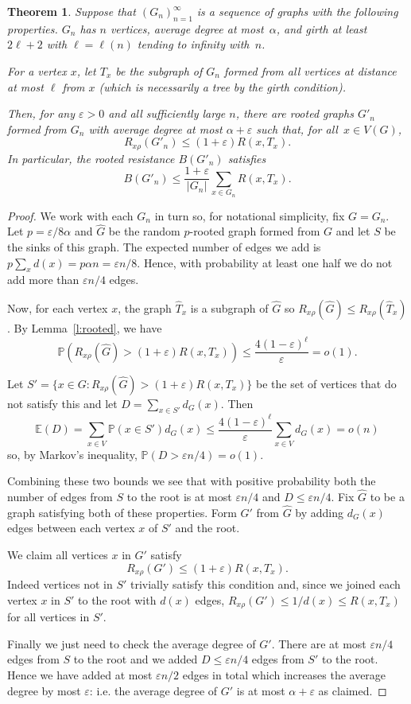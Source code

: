 \documentclass[11pt]{article}
\newtheorem{theorem}{Theorem}
\theoremstyle{remark}
\def\a{\alpha}
\def\eps{\varepsilon}
\def\E{\mathbb{E}}
\newcommand\Prb{\mathbb{P}}
\begin{document}
\begin{theorem}\label{t:main-rooted-rrg-lemma}
  Suppose that $(G_n)_{n=1}^\infty$ is a sequence of graphs with the
  following properties. $G_n$ has $n$ vertices, average degree at
  most~$\a$,  and girth at least~$2\ell+2$ with
  $\ell=\ell(n)$ tending to infinity with~$n$.

  For a vertex $x$, let $T_x$ be the subgraph of $G_n$ formed from all
  vertices at distance at most $\ell$ from $x$ (which is necessarily a
  tree by the girth condition).

  Then, for any $\eps>0$ and all sufficiently large $n$, there are
  rooted graphs $G'_n$ formed from $G_n$ with average degree at most
  $\a+\eps$ such that, for all~$x\in V(G)$, 
  \[
  R_{x\rho}(G'_n)\le (1+\eps)R(x,T_x).
  \]
  In particular, the rooted resistance $B(G'_n)$ satisfies
  \[
  B(G'_n)\le \frac{1+\eps}{|G_n|}\sum_{x\in G_n}R(x,T_x).
  \]
\end{theorem}
\begin{proof}
  We work with each $G_n$ in turn so, for notational simplicity, fix
  $G=G_n$. Let $p=\eps/8\a$ and $\widehat G$ be the random
  $p$-rooted graph formed from $G$ and let $S$ be the sinks of this
  graph.  The expected number of edges we add is
  $p\sum_xd(x)=p\alpha n=\eps n/8$. Hence, with probability at least
  one half we do not add more than $\eps n/4$ edges.
  
  Now, for each vertex $x$, the graph $\widehat T_x$ is a subgraph of
  $\widehat G$ so $R_{x\rho}(\widehat G)\le R_{x\rho}(\widehat T_x)$.  By
  Lemma~\ref{l:rooted}, we have
  \[
  \Prb\left(R_{x\rho}(\widehat G)>(1+\eps)R(x,T_x)\right)\le \frac{4(1-\eps)^\ell}{\eps}=o(1).
  \]

  Let $S'=\{x\in G:R_{x\rho}(\widehat G)>(1+\eps)R(x,T_x)\}$ be the
  set of vertices that do not satisfy this and let
  $D=\sum_{x\in S'}d_G(x)$. Then
  \[\E(D)=\sum_{x\in V}\Prb(x\in S')d_G(x)\le
    \frac{4(1-\eps)^\ell}{\eps}\sum_{x\in V}d_G(x)=o(n)\] so, by
  Markov's inequality, $\Prb(D>\eps n/4)=o(1)$.

  Combining these two bounds we see that with positive probability both the
  number of edges from $S$ to the root is at most $\eps n/4$ and
  $D\le \eps n/4$. Fix $\widehat G$ to be a graph satisfying both of
  these properties.  Form $G'$ from $\widehat G$ by adding $d_G(x)$
  edges between each vertex $x$ of $S'$ and the root.

  We claim all vertices $x$ in $G'$ satisfy
  \[
  R_{x\rho}(G')\le(1+\eps)R(x,T_x).
  \]
  Indeed vertices not in $S'$ trivially satisfy this condition and,
  since we joined each  vertex $x$ in $S'$ to the root
  with $d(x)$ edges, $R_{x\rho}(G')\le 1/d(x)\le R(x,T_x)$ for all
  vertices in $S'$.

  Finally we just need to check the average degree of $G'$. There are
  at most $\eps n/4$ edges from $S$ to the root and we added $D\le
  \eps n/4$ edges from $S'$ to the root. Hence we have added at most
  $\eps n/2$ edges in total which increases the average degree by most
  $\eps$: i.e. the average degree of $G'$ is at most $\a+\eps$ as
  claimed.
\end{proof}
\end{document}
